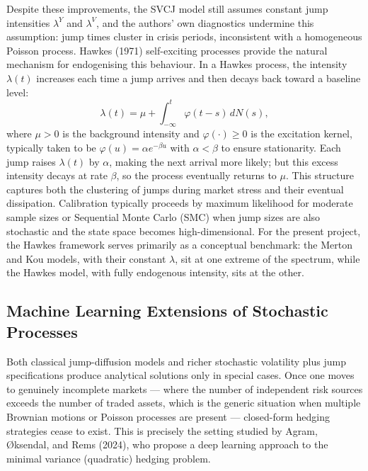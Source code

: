 \documentclass[12pt]{article}
\begin{document}
Despite these improvements, the SVCJ model still assumes constant jump intensities $\lambda^Y$ and $\lambda^V$, and the authors' own diagnostics undermine this assumption: jump times cluster in crisis periods, inconsistent with a homogeneous Poisson process. Hawkes (1971) self-exciting processes provide the natural mechanism for endogenising this behaviour. In a Hawkes process, the intensity $\lambda(t)$ increases each time a jump arrives and then decays back toward a baseline level:
\begin{equation}
\lambda(t) = \mu + \int_{-\infty}^{t}\varphi(t-s)\,dN(s),
\end{equation}
where $\mu > 0$ is the background intensity and $\varphi(\cdot) \geq 0$ is the excitation kernel, typically taken to be $\varphi(u) = \alpha e^{-\beta u}$ with $\alpha < \beta$ to ensure stationarity. Each jump raises $\lambda(t)$ by $\alpha$, making the next arrival more likely; but this excess intensity decays at rate $\beta$, so the process eventually returns to $\mu$. This structure captures both the clustering of jumps during market stress and their eventual dissipation. Calibration typically proceeds by maximum likelihood for moderate sample sizes or Sequential Monte Carlo (SMC) when jump sizes are also stochastic and the state space becomes high-dimensional. For the present project, the Hawkes framework serves primarily as a conceptual benchmark: the Merton and Kou models, with their constant $\lambda$, sit at one extreme of the spectrum, while the Hawkes model, with fully endogenous intensity, sits at the other.

\subsection*{Machine Learning Extensions of Stochastic Processes}

Both classical jump-diffusion models and richer stochastic volatility plus jump specifications produce analytical solutions only in special cases. Once one moves to genuinely incomplete markets --- where the number of independent risk sources exceeds the number of traded assets, which is the generic situation when multiple Brownian motions or Poisson processes are present --- closed-form hedging strategies cease to exist. This is precisely the setting studied by Agram, \O{}ksendal, and Rems (2024), who propose a deep learning approach to the minimal variance (quadratic) hedging problem.
\end{document}
